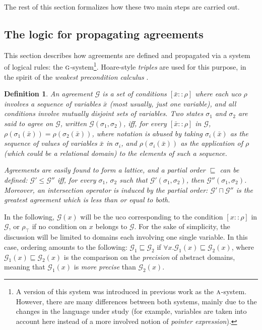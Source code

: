 \documentclass[prodmode,acmtocl]{acmsmall}
\def\state{\ensuremath{\sigma}\xspace}
\def\uco{\ensuremath{\rho}\xspace}
\newcommand{\0}{\mbox{\bf 0}}
\newtheorem{mydefinition}[theorem]{Definition}
\def\TOPDOM{\ensuremath{\uco_{\top}}\xspace}
\def\AGREEM{\mathcal{G}}
\newcommand{\AGRS}[2]{[#2{::}#1]}
\newcommand{\RULENAME}[1]{\textsc{#1}}
\newcommand{\GSMTH}[1]{$\RULENAME{g}$-#1}
\def\GSYSTEM{\GSMTH{system}\xspace}
\begin{document}
\noindent
The rest of this section formalizes how these two main steps are
carried out.

\subsection{The logic for propagating agreements}
\label{section:theLogicForPropagatingAgreements}

This section describes how agreements are defined and propagated via a
system of logical rules: the \GSYSTEM\footnote{A version of this
  system was introduced in previous work \cite{Zanardini} as the
  $\RULENAME{a}$-system.  However, there are many differences between
  both systems, mainly due to the changes in the language under study
  (for example, variables are taken into account here instead of a
  more involved notion of \emph{pointer expression}).}.  Hoare-style
\emph{triples} \cite{Hoa69} are used for this purpose, in the spirit
of the \emph{weakest precondition calculus} \cite{Dij75}.

\begin{mydefinition}
  \label{def:agreement}
  An \emph{agreement} $\AGREEM$ is a set of conditions
  $\AGRS{\uco}{\bar{x}}$ where each uco $\rho$ involves a sequence of
  variables $\bar{x}$ (most usually, just one variable), and all
  conditions involve mutually disjoint sets of variables.  Two states
  $\state_1$ and $\state_2$ are said to \emph{agree} on $\AGREEM$,
  written $\AGREEM(\state_1,\state_2)$, iff, for every
  $\AGRS{\uco}{\bar{x}}$ in $\AGREEM$, $\uco(\state_1(\bar{x})) =
  \uco(\state_2(\bar{x}))$, where notation is abused by taking
  $\state_i(\bar{x})$ as the sequence of values of variables $\bar{x}$
  in $\state_i$, and $\uco(\state_i(\bar{x}))$ as the application of
  $\uco$ (which could be a relational domain) to the elements of such
  a sequence.

  Agreements are easily found to form a lattice, and a partial order
  $\sqsubseteq$ can be defined: $\AGREEM' \leq \AGREEM''$ iff, for
  every $\state_1$, $\state_2$ such that
  $\AGREEM'(\state_1,\state_2)$, then $\AGREEM''(\state_1,\state_2)$.
  Moreover, an intersection operator is induced by the partial order:
  $\AGREEM' \sqcap \AGREEM''$ is the greatest agreement which is less
  than or equal to both.
\end{mydefinition}

In the following, $\AGREEM(x)$ will be the uco corresponding to the
condition $\AGRS{\uco}{x}$ in $\AGREEM$, or $\TOPDOM$ if no condition
on $x$ belongs to $\AGREEM$.  For the sake of simplicity, the
discussion will be limited to domains each involving one single
variable.  In this case, ordering amounts to the following: $\AGREEM_1
\sqsubseteq \AGREEM_2$ if $\forall x.\AGREEM_1(x) \sqsubseteq
\AGREEM_2(x)$, where $\AGREEM_1(x) \sqsubseteq \AGREEM_2(x)$ is the
comparison on the \emph{precision} of abstract domains, meaning that
$\AGREEM_1(x)$ is \emph{more precise} than $\AGREEM_2(x)$.
\end{document}
